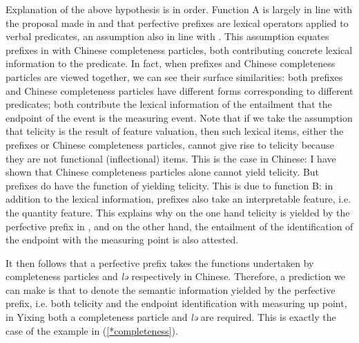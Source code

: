 \documentclass[output=paper]{langsci/langscibook}
\begin{document}
Explanation of the above hypothesis is in order. Function A is largely in line with the proposal made in \textcite{filip2005telicparameter} and \textcite{filiprothstein2005} that  perfective prefixes are lexical operators applied to verbal predicates, an assumption also in line with \textcite{partee1995quantification}. This assumption equates prefixes in  with Chinese completeness particles, both contributing concrete lexical information to the predicate. In fact, when  prefixes and Chinese completeness particles are viewed together, we can see their surface similarities: both  prefixes and Chinese completeness particles have different forms corresponding to different predicates; both contribute the lexical information of the entailment that the endpoint of the event is the measuring event. Note that if we take the assumption that telicity is the result of feature valuation, then such lexical items, either the  prefixes or Chinese completeness particles, cannot give rise to telicity because they are not functional (inflectional) items. This is the case in Chinese: I have shown that Chinese completeness particles alone cannot yield telicity. But  prefixes do have the function of yielding telicity. This is due to function B: in addition to the lexical information,  prefixes also take an interpretable feature, i.e. the quantity feature. This explains why on the one hand telicity is yielded by the perfective prefix in , and on the other hand, the entailment of the identification of the endpoint with the measuring point is also attested.

It then follows that a  perfective prefix takes the functions
undertaken by completeness particles and \emph{lə} respectively in Chinese.
Therefore, a prediction we can make is that to denote the semantic information
yielded by the  perfective prefix, i.e. both telicity and the
endpoint identification with measuring up point, in Yixing both a completeness
particle and \emph{lə} are required. This is exactly the case of the example in
(\ref{*completeness}).
\end{document}
